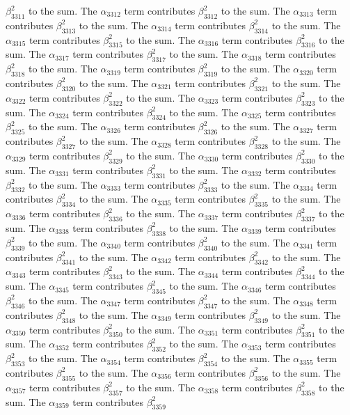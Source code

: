\begin{lemma}
$\beta_{3311}^{2}$ to the sum. The $\alpha_{3312}$ term contributes $\beta_{3312}^{2}$ to the sum. The $\alpha_{3313}$ term contributes $\beta_{3313}^{2}$ to the sum. The $\alpha_{3314}$ term contributes $\beta_{3314}^{2}$ to the sum. The $\alpha_{3315}$ term contributes $\beta_{3315}^{2}$ to the sum. The $\alpha_{3316}$ term contributes $\beta_{3316}^{2}$ to the sum. The $\alpha_{3317}$ term contributes $\beta_{3317}^{2}$ to the sum. The $\alpha_{3318}$ term contributes $\beta_{3318}^{2}$ to the sum. The $\alpha_{3319}$ term contributes $\beta_{3319}^{2}$ to the sum. The $\alpha_{3320}$ term contributes $\beta_{3320}^{2}$ to the sum. The $\alpha_{3321}$ term contributes $\beta_{3321}^{2}$ to the sum. The $\alpha_{3322}$ term contributes $\beta_{3322}^{2}$ to the sum. The $\alpha_{3323}$ term contributes $\beta_{3323}^{2}$ to the sum. The $\alpha_{3324}$ term contributes $\beta_{3324}^{2}$ to the sum. The $\alpha_{3325}$ term contributes $\beta_{3325}^{2}$ to the sum. The $\alpha_{3326}$ term contributes $\beta_{3326}^{2}$ to the sum. The $\alpha_{3327}$ term contributes $\beta_{3327}^{2}$ to the sum. The $\alpha_{3328}$ term contributes $\beta_{3328}^{2}$ to the sum. The $\alpha_{3329}$ term contributes $\beta_{3329}^{2}$ to the sum. The $\alpha_{3330}$ term contributes $\beta_{3330}^{2}$ to the sum. The $\alpha_{3331}$ term contributes $\beta_{3331}^{2}$ to the sum. The $\alpha_{3332}$ term contributes $\beta_{3332}^{2}$ to the sum. The $\alpha_{3333}$ term contributes $\beta_{3333}^{2}$ to the sum. The $\alpha_{3334}$ term contributes $\beta_{3334}^{2}$ to the sum. The $\alpha_{3335}$ term contributes $\beta_{3335}^{2}$ to the sum. The $\alpha_{3336}$ term contributes $\beta_{3336}^{2}$ to the sum. The $\alpha_{3337}$ term contributes $\beta_{3337}^{2}$ to the sum. The $\alpha_{3338}$ term contributes $\beta_{3338}^{2}$ to the sum. The $\alpha_{3339}$ term contributes $\beta_{3339}^{2}$ to the sum. The $\alpha_{3340}$ term contributes $\beta_{3340}^{2}$ to the sum. The $\alpha_{3341}$ term contributes $\beta_{3341}^{2}$ to the sum. The $\alpha_{3342}$ term contributes $\beta_{3342}^{2}$ to the sum. The $\alpha_{3343}$ term contributes $\beta_{3343}^{2}$ to the sum. The $\alpha_{3344}$ term contributes $\beta_{3344}^{2}$ to the sum. The $\alpha_{3345}$ term contributes $\beta_{3345}^{2}$ to the sum. The $\alpha_{3346}$ term contributes $\beta_{3346}^{2}$ to the sum. The $\alpha_{3347}$ term contributes $\beta_{3347}^{2}$ to the sum. The $\alpha_{3348}$ term contributes $\beta_{3348}^{2}$ to the sum. The $\alpha_{3349}$ term contributes $\beta_{3349}^{2}$ to the sum. The $\alpha_{3350}$ term contributes $\beta_{3350}^{2}$ to the sum. The $\alpha_{3351}$ term contributes $\beta_{3351}^{2}$ to the sum. The $\alpha_{3352}$ term contributes $\beta_{3352}^{2}$ to the sum. The $\alpha_{3353}$ term contributes $\beta_{3353}^{2}$ to the sum. The $\alpha_{3354}$ term contributes $\beta_{3354}^{2}$ to the sum. The $\alpha_{3355}$ term contributes $\beta_{3355}^{2}$ to the sum. The $\alpha_{3356}$ term contributes $\beta_{3356}^{2}$ to the sum. The $\alpha_{3357}$ term contributes $\beta_{3357}^{2}$ to the sum. The $\alpha_{3358}$ term contributes $\beta_{3358}^{2}$ to the sum. The $\alpha_{3359}$ term contributes $\beta_{3359}^{2}$ 
\end{lemma}
